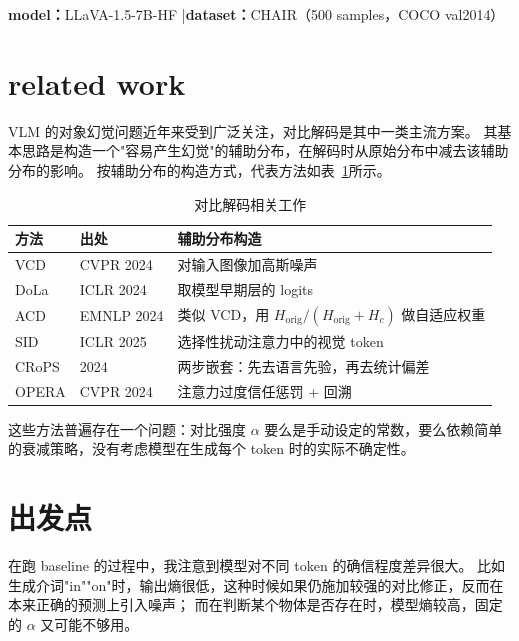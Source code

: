 \documentclass[12pt,a4paper]{ctexart}
\begin{document}
\maketitle

\noindent\textbf{model：}LLaVA-1.5-7B-HF \quad|\quad \textbf{dataset：}CHAIR（500 samples，COCO val2014）

\section{related work}

VLM 的对象幻觉问题近年来受到广泛关注，对比解码是其中一类主流方案。
其基本思路是构造一个"容易产生幻觉"的辅助分布，在解码时从原始分布中减去该辅助分布的影响。
按辅助分布的构造方式，代表方法如表~\ref{tab:related}所示。

\begin{table}[H]
\centering
\caption{对比解码相关工作}
\label{tab:related}
\begin{tabular}{lll}
\toprule
\textbf{方法} & \textbf{出处} & \textbf{辅助分布构造} \\
\midrule
VCD   & CVPR 2024   & 对输入图像加高斯噪声 \\
DoLa  & ICLR 2024   & 取模型早期层的 logits \\
ACD   & EMNLP 2024  & 类似 VCD，用 $H_{\text{orig}}/(H_{\text{orig}}+H_c)$ 做自适应权重 \\
SID   & ICLR 2025   & 选择性扰动注意力中的视觉 token \\
CRoPS & 2024        & 两步嵌套：先去语言先验，再去统计偏差 \\
OPERA & CVPR 2024   & 注意力过度信任惩罚 + 回溯 \\
\bottomrule
\end{tabular}
\end{table}

这些方法普遍存在一个问题：对比强度 $\alpha$ 要么是手动设定的常数，要么依赖简单的衰减策略，没有考虑模型在生成每个 token 时的实际不确定性。

\section{出发点}

在跑 baseline 的过程中，我注意到模型对不同 token 的确信程度差异很大。
比如生成介词"in""on"时，输出熵很低，这种时候如果仍施加较强的对比修正，反而在本来正确的预测上引入噪声；
而在判断某个物体是否存在时，模型熵较高，固定的 $\alpha$ 又可能不够用。
\end{document}
